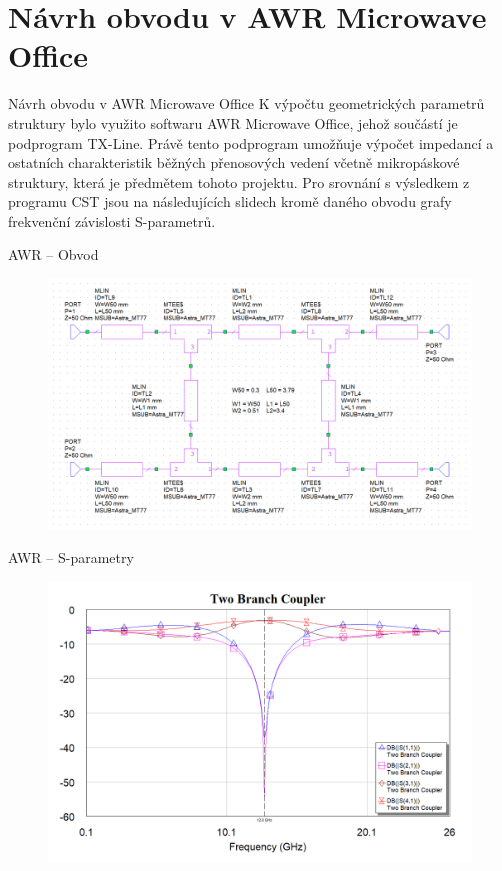 \documentclass[aspectratio=169, 11pt, hyperref={unicode}]{beamer}
\begin{document}
\section{Návrh obvodu v AWR Microwave Office}
\begin{frame}{Návrh obvodu v AWR Microwave Office}
    K výpočtu geometrických parametrů struktury bylo využito softwaru AWR Microwave Office, jehož součástí je podprogram TX-Line. Právě tento podprogram umožňuje výpočet impedancí a ostatních charakteristik běžných přenosových vedení včetně mikropáskové struktury, která je předmětem tohoto projektu. Pro srovnání s výsledkem z programu CST jsou na následujících slidech kromě daného obvodu grafy frekvenční závislosti S-parametrů.
\end{frame}
\begin{frame}{AWR -- Obvod}
	\begin{figure}[!ht]
		\centering
		\includegraphics[width=.7\textwidth]{src/AWR_circuit.png}
	\end{figure}
\end{frame}
\begin{frame}{AWR -- S-parametry}
	\begin{figure}[!ht]
		\centering
		\includegraphics[width=.7\textwidth]{src/AWR_S-parameters.png}
	\end{figure}
\end{frame}
\end{document}
